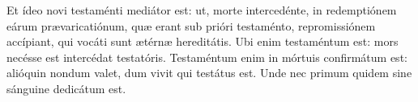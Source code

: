 Et ídeo novi testaménti mediátor est:
	ut, morte intercedénte, in redemptiónem eárum prævaricatiónum,
		quæ erant sub prióri testaménto,
	repromissiónem accípiant, qui vocáti sunt ætérnæ hereditátis.
Ubi enim testaméntum est: mors necésse est intercédat testatóris.
Testaméntum enim in mórtuis confirmátum est: alióquin nondum valet,
	dum vivit qui testátus est.
Unde nec primum quidem sine sánguine dedicátum est.
